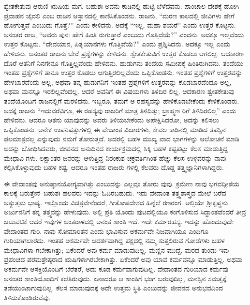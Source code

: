 ಶ್ವೇತಕೇತುವು ಆರುಣಿ ಋಷಿಯ ಮಗ. ಬಹುಶಃ ಅವನು ಕಾಡಿನಲ್ಲಿ ಹುಟ್ಟಿ ಬೆಳೆದವನು. ಪಾಂಚಾಲ ದೇಶಕ್ಕೆ ಹೋಗಿ ಪ್ರವಾಹನ ಜೈವಲಿ ಎಂಬ ರಾಜನ ಆಸ್ಥಾನದಲ್ಲಿ ಕಾಣಿಸಿಕೊಂಡನು. ರಾಜನು, “ಮರಣ ಕಾಲದಲ್ಲಿ ಜೀವಿಗಳು ಹೇಗೆ ಹೋಗುತ್ತವೆ ಎಂಬುದು ಗೊತ್ತೆ?” ಎಂದು ಕೇಳಿದನು. ಅದಕ್ಕೆ “ಇಲ್ಲ, ಮಹಾ ಶಯರೆ” ಎಂದು ಉತ್ತರ ಕೊಟ್ಟನು. ಅನಂತರ ರಾಜ, “ಅವರು ಪುನಃ ಹೇಗೆ ಹಿಂತಿ ರುಗುತ್ತಾರೆ ಎಂಬುದು ಗೊತ್ತಿದೆಯೆ?” ಎಂದನು. ಅದಕ್ಕೂ ಇಲ್ಲವೆಂದು ಉತ್ತರ ಕೊಟ್ಟನು. “ದೇವಯಾನ, ಪಿತೃಯಾನಗಳು ಗೊತ್ತಿವೆಯೆ?” ಎಂದು ಪ್ರಶ್ನಿಸಿದನು. ಅದಕ್ಕೂ ಇಲ್ಲ ಎಂದು ಹೇಳಿದನು. ಅನಂತರ ರಾಜನು ಬೇರೆ ಪ್ರಶ್ನೆಗಳನ್ನು ಕೇಳಿದನು. ಶ್ವೇತಕೇತುವಿಗೆ ಉತ್ತರ ಕೊಡಲು ಆಗಲಿಲ್ಲ. ಆದಕಾರಣ ದೊರೆ ಆತನಿಗೆ ನಿನಗೇನೂ ಗೊತ್ತಿಲ್ಲವೆಂದು ಹೇಳಿದನು. ಹುಡುಗನು ತಂದೆಯ ಸಮೀಪಕ್ಕೆ ಹಿಂತಿರುಗಿದನು. ತಂದೆಯು ಇಂತಹ ಪ್ರಶ್ನೆಗಳಿಗೆ ತಾನೂ ಉತ್ತರ ಕೊಡಲು ಆಗುತ್ತಿರಲಿಲ್ಲವೆಂದು ಒಪ್ಪಿಕೊಂಡನು. ಇಂತಹ ಪ್ರಶ್ನೆಗಳಿಗೆ ಉತ್ತರವನ್ನು ಹೇಳಬಾರದೆಂದು ಅಲ್ಲ, ಅಥವಾ ತನ್ನ ಹುಡುಗನಿಗೆ ಇಂತಹ ಪ್ರಶ್ನೆಗಳಿಗೆ ಉತ್ತರವನ್ನು ಕೊಡಬಾರದೆಂದೂ ಅಲ್ಲ, ಅಥವಾ ಮನಸ್ಸೂ ಇರಲಿಲ್ಲವೆಂದಲ್ಲ. ಆದರೆ ಅವನಿಗೆ ಈ ವಿಷಯಗಳು ತಿಳಿದಿರ ಲಿಲ್ಲ. ಆದಕಾರಣ ಶ್ವೇತಕೇತುವು ತಂದೆಯೊಂದಿಗೆ ರಾಜನಲ್ಲಿಗೆ ಮರಳಿದನು. ಇಬ್ಬರೂ, ತಮಗೆ ಆ ರಹಸ್ಯವನ್ನು ಹೇಳಿಕೊಡಬೇಕೆಂದು ಕೇಳಿಕೊಂಡರು. ಅದಕ್ಕೆ ರಾಜನು “ಇದುವರೆವಿಗೂ, ಈ ರಹಸ್ಯವು ರಾಜರಿಗೆ ಮಾತ್ರ ತಿಳಿದಿತ್ತು; ಬ್ರಾಹ್ಮಣ ರಿಗೆ ತಿಳಿದಿರಲಿಲ್ಲ” ಎಂದು ಹೇಳಿದನು. ಆದರೂ ಆತನು ಯಾವುದನ್ನು ಅವರು ತಿಳಿಯಬೇಕೆಂದು ಅಪೇಕ್ಷಿಸಿದರೋ, ಅದನ್ನು ಕಲಿಸಲು ಒಪ್ಪಿಕೊಂಡನು. ಅನೇಕ ಉಪನಿಷತ್ತುಗಳಲ್ಲಿ ಈ ವೇದಾಂತ ವಿಚಾರಗಳು, ಕೇವಲ ಕಾಡಿನಲ್ಲಿ ಮಾಡಿದ ತಪಸ್ಸಿನ ಫಲಮಾತ್ರವಲ್ಲ ಎನ್ನುವುದು ನಮಗೆ ತೋರುತ್ತದೆ. ಅದರಲ್ಲಿ ಬಹಳ ಮುಖ್ಯ ವಾದ ಭಾಗಗಳನ್ನು ಆಲೋಚನೆ ಮಾಡಿ ಅದನ್ನು ಬೋಧಿಸಿದವರು, ಜೀವನದ ಅನುದಿನದ ಕಾರ್ಯಕ್ರಮದಲ್ಲಿ ಸಿಕ್ಕಿ ಬಹಳ ಕಷ್ಟಪಟ್ಟು ಕೆಲಸ ಮಾಡುತ್ತಿದ್ದ ಮೇಧಾವಿ ಗಳು. ಲಕ್ಷಾಂತರ ಜನರನ್ನು ಆಳುತ್ತಿದ್ದ ನಿರಂಕುಶ ಚಕ್ರವರ್ತಿಗಿಂತ ಹೆಚ್ಚು ಕೆಲಸ ಉಳ್ಳವರನ್ನು ನಾವು ಕಲ್ಪಿಸಿಕೊಳ್ಳುವುದು ಬಹಳ ಕಷ್ಟ. ಆದರೂ ಇಂತಹ ರಾಜರು ಗಳಲ್ಲಿ ಕೆಲವರು ದೊಡ್ಡ ತತ್ತ್ವಜ್ಞಾನಿಗಳಾಗಿದ್ದರು.

ಈ ವೇದಾಂತವು ಅನುಷ್ಠಾನಯೋಗ್ಯವಾಗಿತ್ತು ಎಂಬುದನ್ನು ಎಲ್ಲವೂ ತೋರು ವುವು. ಕ್ರಮೇಣ ನಾವು ಭಗವದ್ಗೀತೆಯ ಕಾಲಕ್ಕೆ ಬರುತ್ತೇನೆ–ಬಹುಶಃ ಹಲವರು ಇದನ್ನು ಓದಿರಬಹುದು. ಇದು ವೇದಾಂತ ತತ್ತ್ವಶಾಸ್ತ್ರದ ಮೇಲೆ ಬರೆದ ಅತ್ಯುತ್ತಮ ಭಾಷ್ಯ. ಇಲ್ಲೊಂದು ವಿಚಿತ್ರವೇನೆಂದರೆ, ಗೀತೋಪದೇಶದ ಹಿನ್ನೆಲೆ ರಣರಂಗ. ಅಲ್ಲಿಯೇ ಶ‍್ರೀಕೃಷ್ಣನು ಅರ್ಜುನನಿಗೆ ತನ್ನ ತತ್ತ್ವವನ್ನು ಹೇಳುವುದು. ಅಲ್ಲಿ ಪ್ರತಿ ಯೊಂದು ಪುಟದಲ್ಲಿಯೂ ಕಂಗೊಳಿಸುವ ಸಿದ್ಧಾಂತವೆಂದರೆ ತೀವ್ರ ಚಟುವಟಿಕೆ ಆದರೆ ಇವುಗಳ ಅಂತರಾಳದಲ್ಲಿ ಅನಂತ ಶಾಂತಿ ಇದೆ. ಇದೇ ಕರ್ಮರಹಸ್ಯ. ಇದನ್ನು ಹೊಂದುವುದೇ ವೇದಾಂತದ ಗುರಿ. ನಾವು ಸೋಮಾರಿತನ ಎಂದು ಭಾವಿಸುವ ಅಕರ್ಮವೇ ನಿಜವಾಗಿಯೂ ಎಂದಿಗೂ ಗುರಿಯಾಗಲಾರದು. ಇಂತಹ ಅಕರ್ಮವೇ ಆದರ್ಶವಾಗಿದ್ದ ಪಕ್ಷದಲ್ಲಿ ನಮ್ಮ ಸುತ್ತಲಿರುವ ಗೋಡೆಗಳು ಬಹಳ ಮೇಧಾವಿಗಳಾ ಗಬೇಕಾಗಿತ್ತು; ಏಕೆಂದರೆ ಅವು ಕರ್ಮ ಮಾಡುವುದಿಲ್ಲ. ಮಣ್ಣಿನ ಮುದ್ದೆ, ಮರದ ತುಂಡು ಇವು ಪ್ರಪಂಚದ ಪರಮಶ್ರೇಷ್ಠರಾದ ಋಷಿಗಳಾಗಿರಬೇಕಾಗಿತ್ತು. ಏಕೆಂದರೆ ಅವು ಯಾವ ಕರ್ಮವನ್ನೂ ಮಾಡುತ್ತಿಲ್ಲ. ಅಥವಾ ಅಕರ್ಮವೇ ಆಸಕ್ತಿಯೊಂದಿಗೆ ಬೆರೆತರೆ, ಅದು ಕೂಡ ಕರ್ಮವಾಗುವುದಿಲ್ಲ. ವೇದಾಂತದ ಗುರಿಯಾದ ಕರ್ಮವು ಅನಂತರ ಶಾಂತಿಯೊಂದಿಗೆ ಕಲೆತಿರುವುದು. ಏನಾದರೂ ಆ ಶಾಂತಿಗೆ ಭಂಗ ಬರುವುದಿಲ್ಲ, ಮನಸ್ಸಿನ ಸಮತ್ವಕ್ಕೆ ತಡೆಯುಂಟಾಗುವುದಿಲ್ಲ. ಕೆಲಸ ಮಾಡುವುದಕ್ಕೆ ಅದೇ ಉತ್ತಮ ಸ್ಥಿತಿ ಎಂಬುದನ್ನು ಜೀವನದ ಅನುಭವದಿಂದ ತಿಳಿದುಕೊಂಡಿರುವೆವು.

